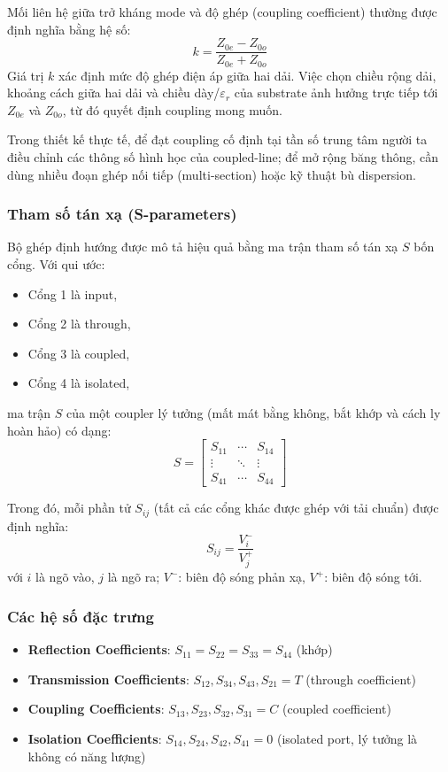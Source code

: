 Mối liên hệ giữa trở kháng mode và độ ghép (coupling coefficient) thường được định nghĩa bằng hệ số:
\[
k=\frac{Z_{0e}-Z_{0o}}{Z_{0e}+Z_{0o}}
\]
Giá trị $k$ xác định mức độ ghép điện áp giữa hai dải. Việc chọn chiều rộng dải, khoảng cách giữa hai dải và chiều dày/$\varepsilon_r$ của substrate ảnh hưởng trực tiếp tới $Z_{0e}$ và $Z_{0o}$, từ đó quyết định coupling mong muốn.

Trong thiết kế thực tế, để đạt coupling cố định tại tần số trung tâm người ta điều chỉnh các thông số hình học của coupled-line; để mở rộng băng thông, cần dùng nhiều đoạn ghép nối tiếp (multi-section) hoặc kỹ thuật bù dispersion.

\subsubsection{Tham số tán xạ (S-parameters)}

Bộ ghép định hướng được mô tả hiệu quả bằng ma trận tham số tán xạ $S$ bốn cổng. 
Với qui ước: 
\begin{itemize}[label=-]
	\item Cổng 1 là input,
	\item Cổng 2 là through,
	\item Cổng 3 là coupled,
	\item Cổng 4 là isolated,
\end{itemize}
ma trận $S$ của một coupler lý tưởng (mất mát bằng không, bắt khớp và cách ly hoàn hảo) có dạng:
\[
S=\begin{bmatrix}
	S_{11}&\cdots&S_{14}\\
	\vdots&\ddots&\vdots\\
	S_{41}&\cdots&S_{44}
\end{bmatrix}
\]

Trong đó, mỗi phần tử $S_{ij}$ (tất cả các cổng khác được ghép với tải chuẩn) được định nghĩa:
\[
S_{ij}=\frac{V_i^-}{V_j^+}
\]
với $i$ là ngõ vào, $j$ là ngõ ra; $V^-$: biên độ sóng phản xạ, $V^+$: biên độ sóng tới.

\subsubsection{Các hệ số đặc trưng}

\begin{itemize}[label=-]
	\item \textbf{Reflection Coefficients}: $S_{11}=S_{22}=S_{33}=S_{44}$ (khớp)
	\item \textbf{Transmission Coefficients}: $S_{12}, S_{34}, S_{43}, S_{21}=T$ (through coefficient)
	\item \textbf{Coupling Coefficients}: $S_{13}, S_{23}, S_{32}, S_{31}=C$ (coupled coefficient)
	\item \textbf{Isolation Coefficients}: $S_{14}, S_{24}, S_{42}, S_{41}=0$ (isolated port, lý tưởng là không có năng lượng)
\end{itemize}

